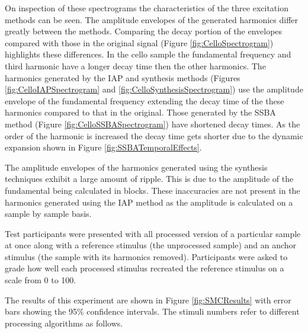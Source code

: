 		On inspection of these spectrograms the characteristics of the three excitation methods can be seen. The
		amplitude envelopes of the generated harmonics differ greatly between the methods. Comparing the decay
		portion of the envelopes compared with those in the original signal (Figure \ref{fig:CelloSpectrogram})
		highlights these differences. In the cello sample the fundamental frequency and third harmonic have a
		longer decay time then the other harmonics. The harmonics generated by the IAP and synthesis methods
		(Figures \ref{fig:CelloIAPSpectrogram} and \ref{fig:CelloSynthesisSpectrogram}) use the amplitude envelope
		of the fundamental frequency extending the decay time of the these harmonics compared to that in the
		original. Those generated by the SSBA method (Figure \ref{fig:CelloSSBASpectrogram}) have shortened decay
		times. As the order of the harmonic is increased the decay time gets shorter due to the dynamic expansion
		shown in Figure \ref{fig:SSBATemporalEffects}.

		The amplitude envelopes of the harmonics generated using the synthesis techniques exhibit a large amount of
		ripple. This is due to the amplitude of the fundamental being calculated in blocks. These inaccuracies are
		not present in the harmonics generated using the IAP method as the amplitude is calculated on a sample by
		sample basis.

		Test participants were presented with all processed version of a particular sample at once along with a
		reference stimulus (the unprocessed sample) and an anchor stimulus (the sample with its harmonics removed).
		Participants were asked to grade how well each processed stimulus recreated the reference stimulus on a
		scale from 0 to 100.

		The results of this experiment are shown in Figure \ref{fig:SMCResults} with error bars showing the 95\%
		confidence intervals. The stimuli numbers refer to different processing algorithms as follows.

